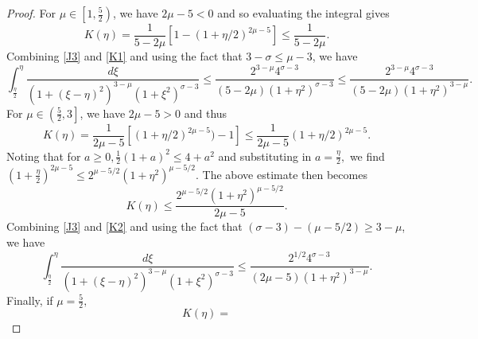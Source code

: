 \documentclass[10pt,a4paper]{amsart}
\begin{document}
\begin{proof}
For $\mu \in \left[1,\frac52\right)$, we have $2\mu-5 < 0$ and so evaluating the integral gives 
\begin{equation}\label{K1}
    K(\eta) = 
         \frac{1}{5-2\mu}\left[1-(1+\eta/2)^{2\mu-5}\right] 
         \leq \frac{1}{5-2\mu}.
\end{equation}
Combining \eqref{J3} and \eqref{K1} and using the fact that $3-\sigma \leq \mu - 3$, we have
\begin{equation}
    \int_{\frac{\eta}{2}}^{\eta}\frac{d \xi}{(1+(\xi - \eta)^2)^{3-\mu}(1 + \xi^2)^{\sigma-3}} 
        \leq \frac{2^{3-\mu}4^{\sigma-3}}{(5-2\mu)(1+\eta^2)^{\sigma-3}}
        \leq \frac{2^{3-\mu}4^{\sigma-3}}{(5-2\mu)(1+\eta^2)^{3-\mu}}.
\end{equation}
For $\mu \in \left(\frac52,3\right]$, we have $2\mu-5 > 0$ and thus
\begin{equation*}
    K(\eta) = 
         \frac{1}{2\mu-5}\left[(1+\eta/2)^{2\mu-5})-1\right] 
         \leq \frac{1}{2\mu-5}\left(1+\eta/2\right)^{2\mu-5}.
\end{equation*}
Noting that for $a \geq 0, \frac12(1+a)^2 \leq 4 + a^2$ and substituting in $a = \frac\eta2,$ we find 
    $(1 + \frac\eta2)^{2\mu-5} \leq 2^{\mu-5/2}(1 + \eta^2)^{\mu-5/2}.$ 
The above estimate then becomes
\begin{equation}\label{K2}
    K(\eta) \leq  
         \frac{2^{\mu-5/2}(1 + \eta^2)^{\mu-5/2}}{2\mu-5}.
\end{equation}
Combining \eqref{J3} and \eqref{K2} and using the fact that $(\sigma-3) - (\mu - 5/2) \geq 3 - \mu$, we have
\begin{equation}
    \int_{\frac{\eta}{2}}^{\eta}\frac{d \xi}{(1+(\xi - \eta)^2)^{3-\mu}(1 + \xi^2)^{\sigma-3}} 
        \leq \frac{2^{1/2}4^{\sigma-3}}{(2\mu-5)(1+\eta^2)^{3-\mu}}.
\end{equation}
Finally, if $\mu = \frac52,$ 
\begin{equation}\label{K3}
    K(\eta) = 

\end{equation}
\end{proof}
\end{document}

